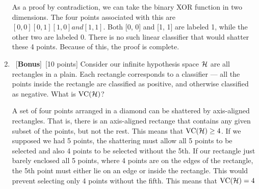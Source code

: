 \documentclass[12pt, fullpage,letterpaper]{article}
\begin{document}
\begin{enumerate}
	As a proof by contradiction, we can take the binary XOR function in two dimensions. The four points associated with this are $[0,0] [0,1] [1,0] and [1,1]$. Both [0, 0] and [1, 1] are labeled 1, while the other two are labeled 0. There is no such linear classifier that would shatter these 4 points. Because of this, the proof is complete.
	
	\item~[\textbf{Bonus}]~[10 points] Consider our infinite hypothesis space $\mathcal{H}$ are all rectangles in a plain. Each rectangle corresponds to a classifier --- all the points inside the rectangle are classified as positive, and otherwise classified as negative. What is $\mathrm{VC}(\mathcal{H})$? 
	
	A set of four points arranged in a diamond can be shattered by axis-aligned rectangles. That is, there is an axis-aligned rectange that contains any given subset of the points, but not the rest. This means that $\mathrm{VC}(\mathcal{H}) \geq 4$. If we supposed we had 5 points, the shattering must allow all 5 points to be selected and also 4 points to be selected without the 5th. If our rectangle just barely enclosed all 5 points, where 4 points are on the edges of the rectangle, the 5th point must either lie on an edge or inside the rectangle. This would prevent selecting only 4 points without the fifth. This means that $\mathrm{VC}(\mathcal{H}) = 4$


\end{enumerate}
\end{document}
